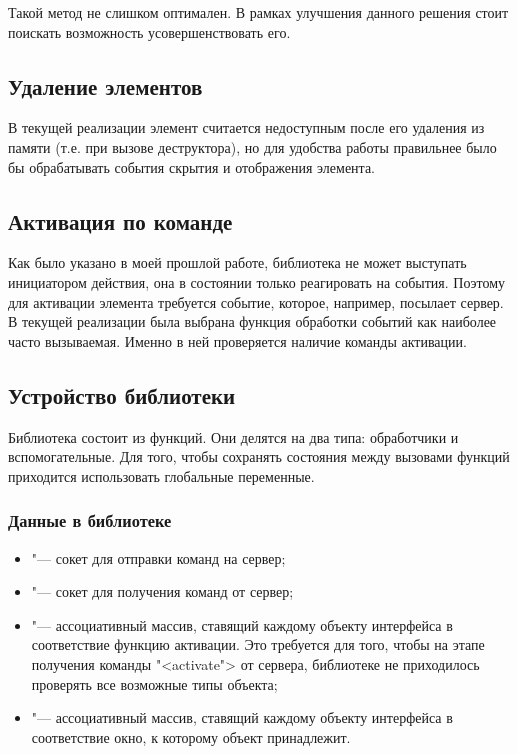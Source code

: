 Такой метод не слишком оптимален. В рамках улучшения данного решения стоит
поискать возможность усовершенствовать его.

\subsection{Удаление элементов}

В текущей реализации элемент считается недоступным после его удаления из памяти
(т.е. при вызове деструктора), но для удобства работы правильнее было бы
обрабатывать события скрытия и отображения элемента.

\subsection{Активация по команде}

Как было указано в моей прошлой работе\cite{polshakovinject}, библиотека не
может выступать инициатором действия, она в состоянии только реагировать на
события. Поэтому для активации элемента требуется событие, которое, например,
посылает сервер. В текущей реализации была выбрана функция обработки событий как
наиболее часто вызываемая. Именно в ней проверяется наличие команды активации.

\subsection{Устройство библиотеки}

Библиотека состоит из функций. Они делятся на два типа: обработчики и 
вспомогательные. Для того, чтобы сохранять состояния между вызовами функций 
приходится использовать глобальные переменные.

\subsubsection{Данные в библиотеке}

\begin{itemize}
	\item {} "--- сокет для отправки команд на сервер;
	\item {} "--- сокет для получения команд от сервер;
	\item {} "--- ассоциативный массив, ставящий каждому объекту
	интерфейса в соответствие функцию активации. Это требуется для того, чтобы
	на этапе получения команды "<activate"> от сервера, библиотеке не 
	приходилось проверять все возможные типы объекта;
	\item {} "--- ассоциативный массив, ставящий каждому
	объекту интерфейса в соответствие окно, к которому объект принадлежит.
\end{itemize}

